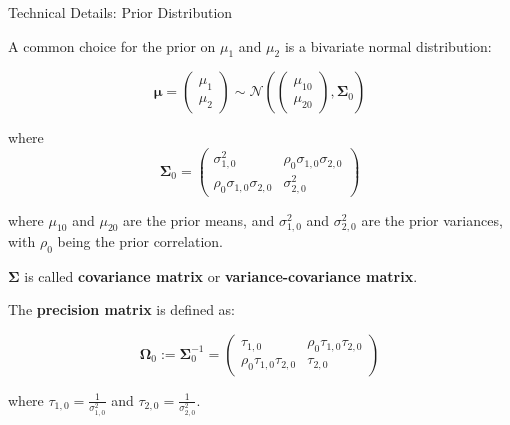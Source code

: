 \begin{frame}{Technical Details: Prior Distribution}

A common choice for the prior on $\mu_1$ and $\mu_2$ is a bivariate normal distribution:

$$
\boldsymbol{\mu} =
\begin{pmatrix}
\mu_1 \\
\mu_2
\end{pmatrix}
\sim \mathcal{N}
\left( 
\begin{pmatrix}
\mu_{10} \\
\mu_{20}
\end{pmatrix},
\boldsymbol{\Sigma}_0
\right)
$$

where
$$
\boldsymbol{\Sigma}_0 = \begin{pmatrix}
\sigma_{1,0}^2 & \rho_0 \sigma_{1,0} \sigma_{2,0} \\
\rho_0 \sigma_{1,0} \sigma_{2,0} & \sigma_{2,0}^2
\end{pmatrix}
$$

where $\mu_{10}$ and $\mu_{20}$ are the prior means, and $\sigma_{1,0}^2$ and $\sigma_{2,0}^2$ are the prior variances, with $\rho_0$ being the prior correlation.

$\boldsymbol{\Sigma}$ is called \textbf{covariance matrix} or \textbf{variance-covariance matrix}.

The \textbf{precision matrix} is defined as:

$$
\boldsymbol{\Omega}_0 := \boldsymbol{\Sigma}^{-1}_0 = 
\begin{pmatrix}
\tau_{1,0} & \rho_0 \tau_{1,0} \tau_{2,0} \\
\rho_0 \tau_{1,0} \tau_{2,0} & \tau_{2,0}
\end{pmatrix}
$$

where $\tau_{1,0} = \frac{1}{\sigma_{1,0}^2}$ and $\tau_{2,0} = \frac{1}{\sigma_{2,0}^2}$.

\end{frame}

